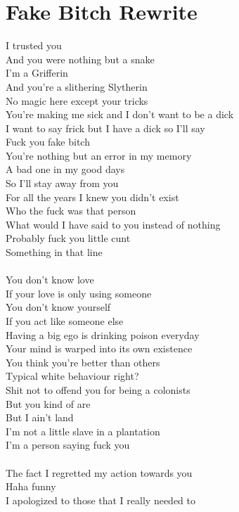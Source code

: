 \documentclass[12pt, b5paper, oneside]{book}
\begin{document}
\section{Fake Bitch Rewrite}
I trusted you
\\And you were nothing but a snake
\\I'm a Grifferin
\\And you're a slithering Slytherin
\\No magic here except your tricks
\\You're making me sick and I don't want to be a dick
\\I want to say frick but I have a dick so I'll say
\\Fuck you fake bitch
\\You're nothing but an error in my memory
\\A bad one in my good days
\\So I'll stay away from you
\\For all the years I knew you didn't exist
\\Who the fuck was that person
\\What would I have said to you instead of nothing
\\Probably fuck you little cunt
\\Something in that line
%
\\\\You don't know love
\\If your love is only using someone
\\You don't know yourself
\\If you act like someone else
\\Having a big ego is drinking poison everyday
\\Your mind is warped into its own existence
\\You think you're better than others
\\Typical white behaviour right?
\\Shit not to offend you for being a colonists
\\But you kind of are
\\But I ain't land
\\I'm not a little slave in a plantation
\\I'm a person saying fuck you
%
\\\\The fact I regretted my action towards you
\\Haha funny
\\I apologized to those that I really needed to
\end{document}
